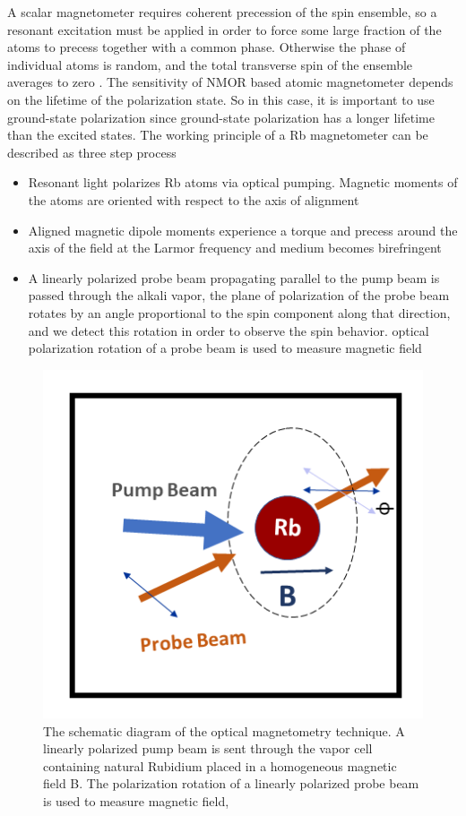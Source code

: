 A scalar magnetometer requires coherent precession of the spin ensemble, so a resonant excitation must be applied in order to force some large fraction of the atoms to precess together with a common phase. Otherwise the phase of individual atoms is random, and the total transverse spin of the ensemble averages to zero . The sensitivity of NMOR based atomic magnetometer depends on the lifetime of the polarization state. So in this case, it is important to use ground-state polarization since ground-state polarization has a longer lifetime than the excited states. The working principle of a Rb magnetometer can be described as three step process
\begin{itemize}
\item
Resonant light polarizes Rb atoms via optical pumping. Magnetic
moments of the atoms are oriented with respect to the axis of
alignment
\end{itemize}
\begin{itemize}
\item Aligned magnetic dipole moments experience a torque and precess around the axis of the field at the Larmor frequency and medium becomes birefringent
\end{itemize}
\begin{itemize}
\item A linearly polarized probe beam propagating parallel to the
pump beam is passed through the alkali vapor, the plane of polarization of the probe beam
rotates by an angle proportional to the spin component along that direction, and we detect
this rotation in order to observe the spin behavior. optical polarization rotation of a probe beam is used to measure magnetic field
\end{itemize}
\begin{figure}[h]
\centering
\includegraphics[width=0.55\linewidth]{figures/optical_pumping}
\caption{The schematic diagram of the optical magnetometry technique.
  A linearly polarized pump beam is sent through the vapor cell
  containing natural Rubidium placed in a homogeneous magnetic field
  B.  The polarization rotation of a linearly polarized probe beam is
  used to measure magnetic field,\label{Rb magnetometry}}
\end{figure}

